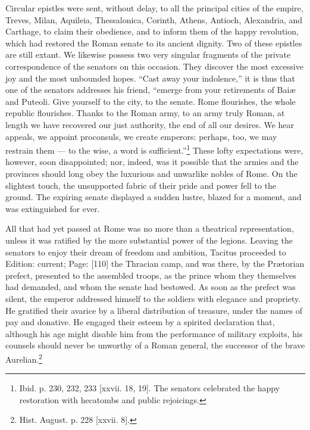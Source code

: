 Circular epistles were sent, without delay, to all the principal cities of the empire, Treves, Milan, Aquileia, Thessalonica, Corinth, Athens, Antioch, Alexandria, and Carthage, to claim their obedience, and to inform them of the happy revolution, which had restored the Roman senate to its ancient dignity. Two of these epistles are still extant. We likewise possess two very singular fragments of the private correspondence of the senators on this occasion. They discover the most excessive joy and the most unbounded hopes. \texthebrew{“}Cast away your indolence,\texthebrew{}” it is thus that one of the senators addresses his friend, \texthebrew{“}emerge from your retirements of Baiæ and Puteoli. Give yourself to the city, to the senate. Rome flourishes, the whole republic flourishes. Thanks to the Roman army, to an army truly Roman, at length we have recovered our just authority, the end of all our desires. We hear appeals, we appoint proconsuls, we create emperors: perhaps, too, we may restrain them \texthebrew{—} to the wise, a word is sufficient.\texthebrew{}”\footnote{Ibid. p. 230, 232, 233 [xxvii. 18, 19]. The senators celebrated the happy restoration with hecatombs and public rejoicings.} These lofty expectations were, however, soon disappointed; nor, indeed, was it possible that the armies and the provinces should long obey the luxurious and unwarlike nobles of Rome. On the slightest touch, the unsupported fabric of their pride and power fell to the ground. The expiring senate displayed a sudden lustre, blazed for a moment, and was extinguished for ever.

All that had yet passed at Rome was no more than a theatrical representation, unless it was ratified by the more substantial power of the legions. Leaving the senators to enjoy their dream of freedom and ambition, Tacitus proceeded to Edition: current; Page: [110] the Thracian camp, and was there, by the Prætorian prefect, presented to the assembled troops, as the prince whom they themselves had demanded, and whom the senate had bestowed. As soon as the prefect was silent, the emperor addressed himself to the soldiers with elegance and propriety. He gratified their avarice by a liberal distribution of treasure, under the names of pay and donative. He engaged their esteem by a spirited declaration that, although his age might disable him from the performance of military exploits, his counsels should never be unworthy of a Roman general, the successor of the brave Aurelian.\footnote{Hist. August. p. 228 [xxvii. 8].}

